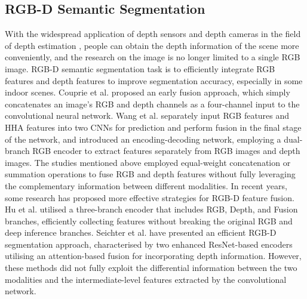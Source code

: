 \documentclass{aims}
\numberwithin{equation}{section}
\begin{document}
\subsection{RGB-D Semantic Segmentation}
With the widespread application of depth sensors and depth cameras in the field of depth estimation \cite{liu2015deep,eigen2015predicting,hu2023bag,hu2023robust}, people can obtain the depth information of the scene more conveniently, and the research on the image is no longer limited to a single RGB image. RGB-D semantic segmentation task is to efficiently integrate RGB features and depth features to improve segmentation accuracy, especially in some indoor scenes. Couprie et al. \cite{he2017std2p} proposed an early fusion approach, which simply concatenates an image's RGB and depth channels as a four-channel input to the convolutional neural network. Wang et al. \cite{gupta2014learning} separately input RGB features and HHA features into two CNNs for prediction and perform fusion in the final stage of the network, and \cite{hazirbas2017fusenet} introduced an encoding-decoding network, employing a dual-branch RGB encoder to extract features separately from RGB images and depth images. The studies mentioned above employed equal-weight concatenation or summation operations to fuse RGB and depth features without fully leveraging the complementary information between different modalities. In recent years, some research has proposed more effective strategies for RGB-D feature fusion. Hu et al. \cite{hu2019acnet} utilised a three-branch encoder that includes RGB, Depth, and Fusion branches, efficiently collecting features without breaking the original RGB and deep inference branches. Seichter et al. \cite{seichter2021efficient} have presented an efficient RGB-D segmentation approach, characterised by two enhanced ResNet-based encoders utilising an attention-based fusion for incorporating depth information. However, these methods did not fully exploit the differential information between the two modalities and the intermediate-level features extracted by the convolutional network.
\end{document}
